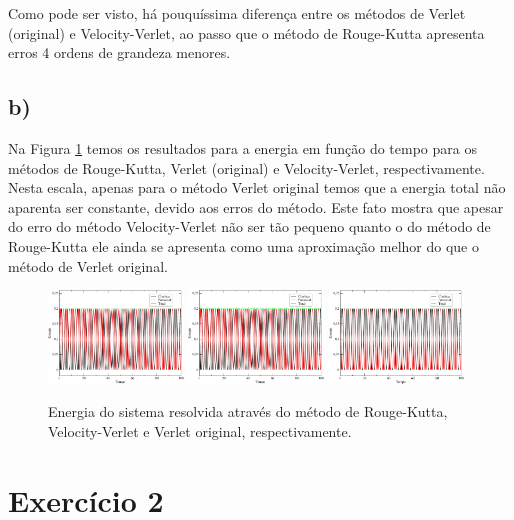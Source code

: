 \documentclass[a4wide]{report}
\begin{document}
Como pode ser visto, há pouquíssima diferença entre os métodos de Verlet (original) e Velocity-Verlet, ao passo que o método de Rouge-Kutta apresenta erros 4 ordens de grandeza menores.


\subsection*{b) }

Na Figura \ref{1} temos os resultados para a energia em função do tempo para os métodos de Rouge-Kutta, Verlet (original) e Velocity-Verlet, respectivamente. Nesta escala, apenas para o método Verlet original temos que a energia total não aparenta ser constante, devido aos erros do método. Este fato mostra que apesar do erro do método Velocity-Verlet não ser tão pequeno quanto o do método de Rouge-Kutta ele ainda se apresenta como uma aproximação melhor do que o método de Verlet original.


\begin{figure}[!htb]
\centering
\includegraphics[width=0.32\textwidth]{rk.pdf}
\includegraphics[width=0.32\textwidth]{VerletO.pdf}
\includegraphics[width=0.32\textwidth]{VerletV.pdf}
\caption{Energia do sistema resolvida através do método de Rouge-Kutta, Velocity-Verlet e Verlet original, respectivamente.}
\label{1}
\end{figure}





\section*{Exercício 2}
\end{document}
